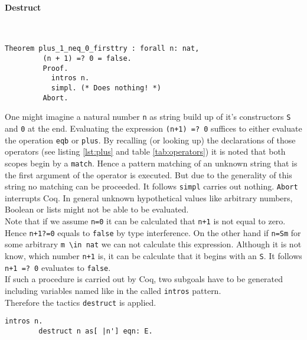 	   \paragraph{Destruct}	~\vspace{-5mm}
	   \begin{lstlisting}[caption= \lstinline! plus_1_neq_0_firsttry!, label=lst:plus_1_neq_0_firsttry]
	   Theorem plus_1_neq_0_firsttry : forall n: nat,
	     (n + 1) =? 0 = false.
	     Proof.
	       intros n.
	       simpl. (* Does nothing! *)
	     Abort.
	   \end{lstlisting}
	    One might imagine a natural number \lstinline!n! as string build up of it's constructors \lstinline!S! and \lstinline!0! at the end.
	    Evaluating the expression \lstinline!(n+1) =? 0! suffices to either evaluate the operation \lstinline!eqb! or \lstinline!plus!.
	    By recalling (or looking up) the declarations of those operators (see listing \ref{lst:plus} and table \ref{tab:operators}) it is noted that both scopes begin by a \lstinline!match!.
	    Hence a pattern matching of an unknown string that is the first argument of the operator is executed.
	    But due to the generality of this string no matching can be proceeded. It follows \lstinline!simpl! carries out nothing. \lstinline!Abort! interrupts Coq.
	    In general unknown hypothetical values like arbitrary numbers, Boolean or lists might not be able to be evaluated.\\		
		Note that if we assume \lstinline!n=0! it can be calculated that \lstinline!n+1! is not equal to zero.
		Hence \lstinline!n+1?=0! equals to \lstinline!false! by type interference. 
		On the other hand if \lstinline!n=Sm! for some arbitrary \lstinline!m \in nat! we can not calculate this expression.
		Although it is not know, which number \lstinline!n+1! is, it can be calculate that it begins with an \lstinline!S!.
		It follows \lstinline!n+1 =? 0! evaluates to \lstinline!false!.\\	
	    If such a procedure is carried out by Coq, two subgoals have to be generated including variables named like in the called \lstinline!intros! pattern.\\        
	    Therefore the tactics \lstinline!destruct! is applied.	
		\begin{lstlisting}[caption = \lstinline! destruct!]
		intros n.
		destruct n as[ |n'] eqn: E.
		\end{lstlisting}
		
